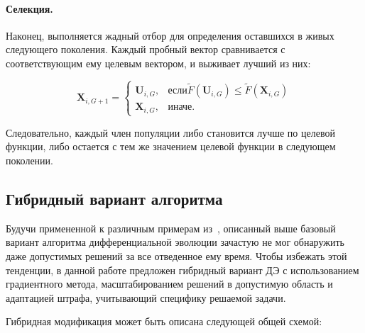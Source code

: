 \documentclass{llncs}
\begin{document}
\paragraph*{Селекция.}

Наконец, выполняется жадный отбор для определения оставшихся в живых следующего поколения. Каждый пробный вектор сравнивается с соответствующим ему целевым вектором, и выживает лучший из них:

\begin{equation}\label{eq:de_sel}
  \textbf{X}_{i,G+1} =
  \begin{cases}
    \textbf{U}_{i,G}, & \mbox{если} \tilde{F}(\textbf{U}_{i,G}) \leq \tilde{F}(\textbf{X}_{i,G}) \\
    \textbf{X}_{i,G}, & \mbox{иначе}.
  \end{cases}
\end{equation}

Следовательно, каждый член популяции либо становится лучше по целевой функции, либо остается с тем же значением целевой функции в следующем поколении.

\subsection{Гибридный вариант алгоритма}
Будучи примененной к различным примерам из~\cite{tyunin:daor}, описанный выше базовый вариант алгоритма  дифференциальной эволюции зачастую не мог обнаружить даже допустимых решений за все отведенное ему время. Чтобы избежать этой тенденции, в данной работе предложен гибридный вариант ДЭ с использованием градиентного метода, масштабированием решений в допустимую область и адаптацией штрафа, учитывающий специфику решаемой задачи. 

Гибридная модификация может быть описана следующей общей схемой:
\end{document}
